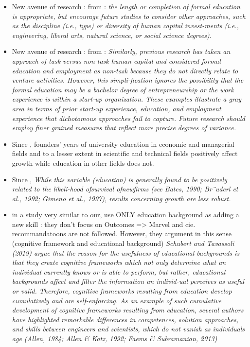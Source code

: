 \begin{itemize}
\begin{itemize}
\begin{itemize}
  \item New avenue of research : from \citep{marvel2016human} : \textit{the length or completion of formal education is appropriate, but encourage future studies to consider other approaches, such as the discipline (i.e., type) or diversity of human capital invest-ments (i.e., engineering, liberal arts, natural science, or social science degrees).}
  \item New avenue of research : from \citep{marvel2016human} : \textit{Similarly, previous research has taken an approach of task versus non-task human capital and considered formal education and employment as non-task because they do not directly relate to venture activities. However, this simpli-fication ignores the possibility that the formal education may be a bachelor degree of entrepreneurship or the work experience is within a start-up organization. These examples illustrate a gray area in terms of prior start-up experience, education, and employment experience that dichotomous approaches fail to capture. Future research should employ finer grained measures that reflect more precise degrees of variance.}
  \item Since \citet{colombo2005founders}, founders’ years of university education in economic and managerial fields and to a lesser extent in scientific and technical fields positively affect growth while education in other fields does not.
  \item Since \citet{colombo2005founders}, \textit{While this variable (education) is generally found to be positively related to the likeli-hood ofsurvival ofnewfirms (see Bates, 1990; Br¨uderl et al., 1992; Gimeno et al., 1997), results concerning growth are less robust.}
  \item in a study very similar to our, \citet{grillitsch2020does} use ONLY education background as adding a new skill : they don't focus on Outcomes => Marvel and cie. recommandatoons are not followed. However, they argument in this sense (cognitive framework and educational background) \textit{Schubert and Tavassoli (2019) argue that the reason for the usefulness of educational backgrounds is that they create cognitive frameworks which not only determine what an individual currently knows or is able to perform, but rather, educational backgrounds affect and filter the information an individ-ual perceives as useful or valid. Therefore, cognitive frameworks resulting from education develop cumulatively and are self-enforcing. As an example of such cumulative development of cognitive frameworks resulting from education, several authors have highlighted remarkable differences in competences, solution approaches, and skills between engineers and scientists, which do not vanish as individuals age (Allen, 1984; Allen & Katz, 1992; Faems & Subramanian, 2013)}
\end{itemize}


\end{itemize}
\end{itemize}
